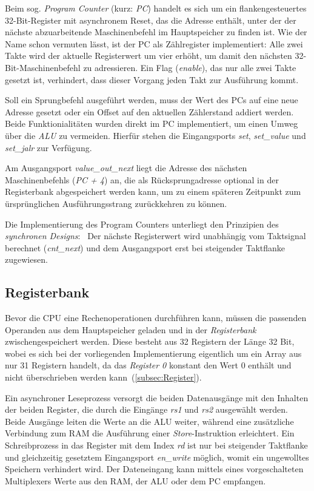 Beim sog. \textit{Program Counter} (kurz: \textit{PC}) handelt es sich um ein flankengesteuertes 32-Bit-Register mit asynchronem Reset, das die Adresse enthält, unter der der nächste abzuarbeitende Maschinenbefehl im Hauptspeicher zu finden ist. 
Wie der Name schon vermuten lässt, ist der PC als Zählregister implementiert:
Alle zwei Takte wird der aktuelle Registerwert um vier erhöht, um damit den nächsten 32-Bit-Maschinenbefehl zu adressieren.
Ein Flag (\textit{enable}), das nur alle zwei Takte gesetzt ist, verhindert, dass dieser Vorgang jeden Takt zur Ausführung kommt.

Soll ein Sprungbefehl ausgeführt werden, muss der Wert des PCs auf eine neue Adresse gesetzt oder ein Offset auf den aktuellen Zählerstand addiert werden.
Beide Funktionialitäten wurden direkt im PC implementiert, um einen Umweg über die \textit{ALU} zu vermeiden.
Hierfür stehen die Eingangsports \textit{set}, \textit{set\_value} und \textit{set\_jalr} zur Verfügung.

Am Ausgangsport \textit{value\_out\_next} liegt die Adresse des nächsten Maschinenbefehls (\textit{PC + 4}) an, die als Rücksprungadresse optional in der Registerbank abgespeichert werden kann, um zu einem späteren Zeitpunkt zum ürsprünglichen Ausführungsstrang zurückkehren zu können.

Die Implementierung des Program Counters unterliegt den Prinzipien des \textit{synchronen Designs}:~\cite[S. 72 ff.]{Chu}
Der nächste Registerwert wird unabhängig vom Taktsignal berechnet (\textit{cnt\_next}) und dem Ausgangsport erst bei steigender Taktflanke zugewiesen. 

\subsection{Registerbank}

Bevor die CPU eine Rechenoperationen durchführen kann, müssen die passenden Operanden aus dem Hauptspeicher geladen und in der \textit{Registerbank} zwischengespeichert werden.
Diese besteht aus 32 Registern der Länge 32 Bit, wobei es sich bei der vorliegenden Implementierung eigentlich um ein Array aus nur 31 Registern handelt, da das \textit{Register 0} konstant den Wert $0$ enthält und nicht überschrieben werden kann~(\ref{subsec:Register}).

Ein asynchroner Leseprozess versorgt die beiden Datenausgänge mit den Inhalten der beiden Register, die durch die Eingänge \textit{rs1} und \textit{rs2} ausgewählt werden.
Beide Ausgänge leiten die Werte an die ALU weiter, während eine zusätzliche Verbindung zum RAM die Ausführung einer \textit{Store}-Instruktion erleichtert.
Ein Schreibprozess in das Register mit dem Index \textit{rd} ist nur bei steigender Taktflanke und gleichzeitig gesetztem Eingangsport \textit{en\_write} möglich, womit ein ungewolltes Speichern verhindert wird.
Der Dateneingang kann mittels eines vorgeschalteten Multiplexers Werte aus den RAM, der ALU oder dem PC empfangen.




